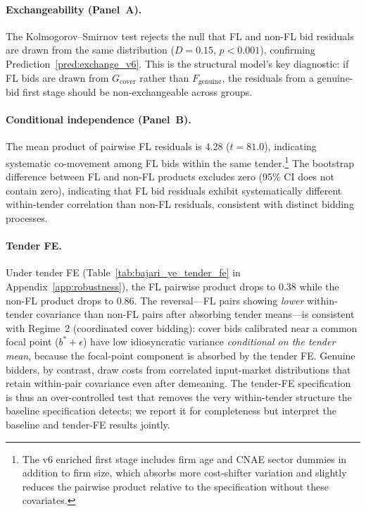 

\paragraph{Exchangeability (Panel~A).}
The Kolmogorov--Smirnov test rejects the null that FL and
non-FL bid residuals are drawn from the same distribution
($D = 0.15$, $p < 0.001$), confirming
Prediction~\ref{pred:exchange_v6}. This is the structural model's
key diagnostic: if FL bids are drawn from $G_{\text{cover}}$ rather
than $F_{\text{genuine}}$, the residuals from a genuine-bid first
stage should be non-exchangeable across groups.

\paragraph{Conditional independence (Panel~B).}
The mean product of pairwise FL residuals is 4.28 ($t = 81.0$), %
indicating systematic co-movement among FL bids within the same
tender.\footnote{The v6 enriched first stage includes firm age and
CNAE sector dummies in addition to firm size, which absorbs more
cost-shifter variation and slightly reduces the pairwise product
relative to the specification without these covariates.}
The bootstrap difference between FL and non-FL products excludes zero
(95\% CI does not contain zero), indicating that FL bid residuals
exhibit systematically different within-tender correlation than non-FL
residuals, consistent with distinct bidding processes.

\paragraph{Tender FE.} %
Under tender FE (Table~\ref{tab:bajari_ye_tender_fe} in
Appendix~\ref{app:robustness}), the FL pairwise product drops to
0.38 while the non-FL product drops to 0.86. The reversal---FL pairs
showing \emph{lower} within-tender covariance than non-FL pairs after
absorbing tender means---is consistent with Regime~2 (coordinated
cover bidding): cover bids calibrated near a common focal point
($b^* + \epsilon$) have low idiosyncratic variance \emph{conditional
on the tender mean}, because the focal-point component is absorbed by
the tender FE. Genuine bidders, by contrast, draw costs from
correlated input-market distributions that retain within-pair
covariance even after demeaning. The tender-FE specification is thus
an over-controlled test that removes the very within-tender structure
the baseline specification detects; we report it for completeness
but interpret the baseline and tender-FE results jointly.

